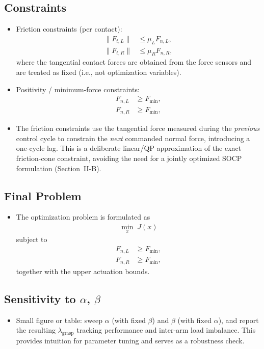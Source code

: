 \documentclass[conference]{IEEEtran}
\begin{document}
\subsection*{Constraints}
\begin{itemize}
    \item Friction constraints (per contact):
    \begin{align}
        \lVert F_{t,L} \rVert
        &\le
        \mu_{L}F_{n,L}, \\
        \lVert F_{t,R} \rVert
        &\le
        \mu_{R}F_{n,R},
    \end{align}
    where the tangential contact forces are obtained from the force sensors and are treated as fixed (i.e., not optimization variables).

    \item Positivity / minimum-force constraints:
    \begin{align}
        F_{n,L}&\geq F_{\mathrm{min}}, \\
        F_{n,R}&\geq F_{\mathrm{min}},
    \end{align}

    \item The friction constraints use the tangential force measured during the \emph{previous} control cycle to constrain the \emph{next} commanded normal force, introducing a one-cycle lag. This is a deliberate linear/QP approximation of the exact friction-cone constraint, avoiding the need for a jointly optimized SOCP formulation (Section~II-B).
\end{itemize}


\subsection*{Final Problem}
\begin{itemize}
    \item The optimization problem is formulated as
    \begin{align}
        \min_{x}\; J(x)
    \end{align}
    subject to
    \begin{align}
        F_{n,L}
        &\ge
        F_{\mathrm{min}}, \\
        F_{n,R}
        &\ge
        F_{\mathrm{min}},
    \end{align}
    together with the upper actuation bounds.

   
\end{itemize}

\subsection*{Sensitivity to $\alpha$, $\beta$}
\begin{itemize}
    \item Small figure or table: sweep \(\alpha\) (with fixed \(\beta\)) and \(\beta\) (with fixed \(\alpha\)), and report the resulting \(\lambda_{\mathrm{grasp}}\) tracking performance and inter-arm load imbalance. This provides intuition for parameter tuning and serves as a robustness check.
\end{itemize}
\end{document}
